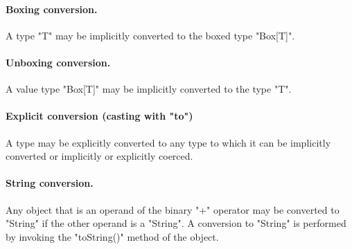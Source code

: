 
\paragraph{Boxing conversion.}
A type \xcd"T" may be implicitly converted to the
boxed type \xcd"Box[T]".


\paragraph{Unboxing conversion.}
A value type \xcd"Box[T]" may be implicitly converted to the
type \xcd"T".


\paragraph{Explicit conversion (casting with \xcd"to")}
A type may be explicitly converted to any type to which it can be
implicitly converted or implicitly or explicitly coerced.


\paragraph{String conversion.}
Any object that is an operand of the binary
\xcd"+" operator may
be converted to \xcd"String" if the other operand is a \xcd"String".
A conversion to \xcd"String" is performed by invoking the \xcd"toString()"
method of the object.


